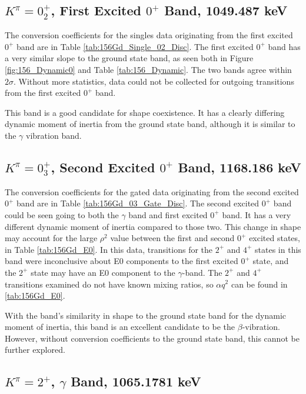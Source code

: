 \subsection{$K^{\pi}=0^+_2$, First Excited $0^+$ Band, 1049.487 keV}

The conversion coefficients for the singles data originating from the first excited $0^+$ band are in Table \ref{tab:156Gd_Single_02_Disc}. The first excited $0^+$ band has a very similar slope to the ground state band, as seen both in Figure \ref{fig:156_Dynamic0} and Table \ref{tab:156_Dynamic}. The two bands agree within $2\sigma$. Without more statistics, data could not be collected for outgoing transitions from the first excited $0^+$ band.

This band is a good candidate for shape coexistence. It has a clearly differing dynamic moment of inertia from the ground state band, although it is similar to the $\gamma$ vibration band.



\subsection{$K^{\pi}=0^+_3$, Second Excited $0^+$ Band, 1168.186 keV}

The conversion coefficients for the gated data originating from the second excited $0^+$ band are in Table \ref{tab:156Gd_03_Gate_Disc}. The second excited $0^+$ band could be seen going to both the $\gamma$ band and first excited $0^+$ band. It has a very different dynamic moment of inertia compared to those two. This change in shape may account for the large $\rho^2$ value between the first and second $0^+$ excited states, in Table \ref{tab:156Gd_E0}. In this data, transitions for the $2^+$ and $4^+$ states in this band were inconclusive about E0 components to the first excited $0^+$ state, and the $2^+$ state may have an E0 component to the $\gamma$-band. The $2^+$ and $4^+$ transitions examined do not have known mixing ratios, so $\alpha q^2$ can be found in \ref{tab:156Gd_E0}.

With the band's similarity in shape to the ground state band for the dynamic moment of inertia, this band is an excellent candidate to be the $\beta$-vibration. However, without conversion coefficients to the ground state band, this cannot be further explored.



\subsection{$K^{\pi}=2^+$, $\gamma$ Band, 1065.1781 keV}

